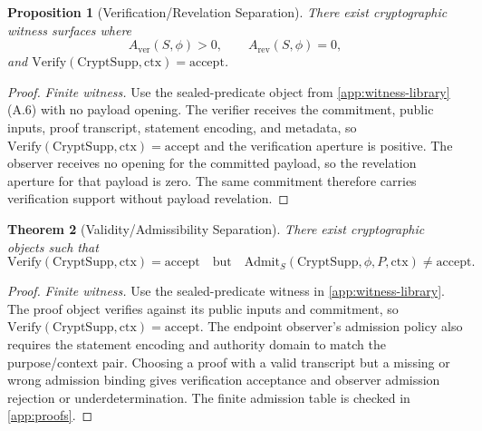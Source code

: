 \documentclass[11pt,twoside]{article}
\newtheorem{theorem}{Theorem}[section]
\newtheorem{proposition}[theorem]{Proposition}
\theoremstyle{definition}
\newcommand{\CryptSupp}{\mathrm{CryptSupp}}
\newcommand{\Admit}{\mathrm{Admit}}
\newcommand{\Verify}{\mathrm{Verify}}
\newcommand{\ctx}{\mathrm{ctx}}
\begin{document}
\begin{proposition}[Verification/Revelation Separation]
\label{prop:verification-revelation-separation}
There exist cryptographic witness surfaces where
\[
  A_{\mathrm{ver}}(S,\phi)>0,\qquad A_{\mathrm{rev}}(S,\phi)=0,
\]
and $\Verify(\CryptSupp,\ctx)=\mathrm{accept}$.
\end{proposition}

\begin{proof}
\textit{Finite witness.}
Use the sealed-predicate object from \cref{app:witness-library} (A.6) with no
payload opening. The verifier receives the commitment, public inputs, proof
transcript, statement encoding, and metadata, so
$\Verify(\CryptSupp,\ctx)=\mathrm{accept}$ and the verification aperture is
positive. The observer receives no opening for the committed payload, so the
revelation aperture for that payload is zero. The same commitment therefore
carries verification support without payload revelation.
\end{proof}

\begin{theorem}[Validity/Admissibility Separation]
\label{thm:validity-admissibility-separation}
There exist cryptographic objects such that
\[
  \Verify(\CryptSupp,\ctx)=\mathrm{accept}
  \quad\text{but}\quad
  \Admit_S(\CryptSupp,\phi,P,\ctx)\neq\mathrm{accept}.
\]
\end{theorem}

\begin{proof}
\textit{Finite witness.}
Use the sealed-predicate witness in \cref{app:witness-library}. The proof
object verifies against its public inputs and commitment, so
$\Verify(\CryptSupp,\ctx)=\mathrm{accept}$. The endpoint observer's admission
policy also requires the statement encoding and authority domain to match the
purpose/context pair. Choosing a proof with a valid transcript but a missing or
wrong admission binding gives verification acceptance and observer admission
rejection or underdetermination. The finite admission table is checked in
\cref{app:proofs}.
\end{proof}
\end{document}
